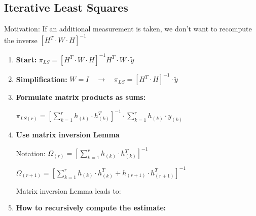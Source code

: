 \documentclass[10pt,a4paper]{scrartcl}
\begin{document}
\begin{multicols*}{3}
\vfill
\null
\columnbreak

\subsection{Iterative Least Squares}


Motivation: If an additional measurement is taken, we don't want to recompute the inverse $[H^T\cdot W\cdot H]^{-1}$ 


\begin{enumerate}
\ncompaq
\item \textbf{Start:} $\pi_{LS}=[H^T\cdot W\cdot H]^{-1}H^T\cdot W\cdot \tilde{y}$
\item \textbf{Simplification:} $W=I\quad\rightarrow\quad \pi_{LS}=[H^T\cdot H]^{-1}\cdot\tilde{y}$
\item \textbf{Formulate matrix products as sums:}

$\pi_{LS (r)}=\left[\sum\limits_{k=1}^r h_{(k)} \cdot h^T_{(k)} \right]^{-1} \cdot \sum\limits_{k=1}^r h_{(k)} \cdot y_{(k)}$
\item \textbf{Use matrix inversion Lemma}

Notation: $\Omega_{(r)} = \left[\sum\limits_{k=1}^r h_{(k)} \cdot h^T _{(k)} \right]^{-1}$

$\Omega_{(r+1)} = \left[\sum\limits_{k=1}^r h_{(k)} \cdot h^T_{(k)} + h_{(r+1)} \cdot h^T_{(r+1)} \right]^{-1}$

\dahe Matrix inversion Lemma leads to:

\item \textbf{How to recursively compute the estimate:}





\end{enumerate}
\end{multicols*}
\end{document}
